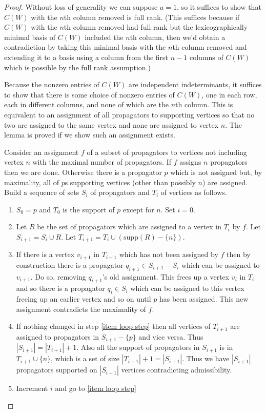 \documentclass[11pt]{article}
\theoremstyle{remark}
\theoremstyle{definition}
\begin{document}
\begin{proof}
Without loss of generality we can suppose $a=1$, so it suffices to show that $C(W)$ with the $n$th column removed is full rank.  (This suffices because if $C(W)$ with the $n$th column removed had full rank but the lexicographically minimal basis of $C(W)$ included the $n$th column, then we'd obtain a contradiction by taking this minimal basis with the $n$th column removed and extending it to a basis using a column from the first $n-1$ columns of $C(W)$ which is possible by the full rank assumption.)

Because the nonzero entries of $C(W)$ are independent indeterminants, it suffices to show that there is some choice of nonzero entries of $C(W)$, one in each row, each in different columns, and none of which are the $n$th column.  This is equivalent to an assignment of all propagators to supporting vertices so that no two are assigned to the same vertex and none are assigned to vertex $n$.  The lemma is proved if we show such an assignment exists.

Consider an assignment $f$ of a subset of propagators to vertices not including vertex $n$ with the maximal number of propagators.  If $f$ assigns $n$ propagators then we are done.  Otherwise there is a propagator $p$ which is not assigned but, by maximality, all of $p$s supporting vertices (other than possibly $n$) are assigned.  Build a sequence of sets $S_i$ of propagators and $T_i$ of vertices as follows.

\begin{enumerate}
  \item $S_0={p}$ and $T_0$ is the support of $p$ except for $n$.  Set $i=0$.
  \item Let $R$ be the set of propagators which are assigned to a vertex in $T_i$ by $f$. Let $S_{i+1}= S_i \cup R$.  Let $T_{i+1} = T_i \cup (\text{supp}(R) - \{n\})$.\label{item loop step}
  \item If there is a vertex $v_{i+1}$ in $T_{i+1}$ which has not been assigned by $f$ then by construction there is a propagator $q_{i+1} \in S_{i+1}-S_i$ which can be assigned to $v_{i+1}$.  Do so, removing $q_{i+1}$'s old assignment.  This frees up a vertex $v_{i}$ in $T_i$ and so there is a propagator $q_{i} \in S_{i}$ which can be assigned to this vertex freeing up an earlier vertex and so on until $p$ has been assigned.  This new assignment contradicts the maximality of $f$.
  \item  If nothing changed in step \ref{item loop step} then all vertices of $T_{i+1}$ are assigned to propagators in $S_{i+1}-\{p\}$ and vice versa.  Thus $|S_{i+1}| = |T_{i+1}|+1$.  Also all the support of propagators in $S_{i+1}$ is in $T_{i+1} \cup \{n\}$, which is a set of size $|T_{i+1}|+1 = |S_{i+1}|$.  Thus we have $|S_{i+1}|$ propagators supported on $|S_{i+1}|$ vertices contradicting admissibility.
  \item Increment $i$ and go to \ref{item loop step}
\end{enumerate}


\end{proof}
\end{document}
